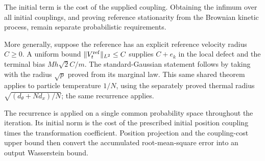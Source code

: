\documentclass[11pt,a4paper]{article}
\begin{document}
The initial term is the cost of the supplied coupling. Obtaining the infimum over all initial couplings, and proving reference stationarity from the Brownian kinetic process, remain separate probabilistic requirements.



More generally, suppose the reference has an explicit reference velocity radius \(C\ge0\). A uniform bound \(\|V_t^{\rm ref}\|_{L^2}\le C\) supplies \(C+e_k\) in the local defect and the terminal bias \(Mh\sqrt2C/m\). The standard-Gaussian statement follows by taking with the radius \(\sqrt p\) proved from its marginal law. This same shared theorem applies to particle temperature \(1/N\), using the separately proved thermal radius \(\sqrt{(d_\theta+Nd_x)/N}\); the same recurrence applies.



The recurrence is applied on a single common probability space throughout the iteration. Its initial norm is the cost of the prescribed initial position coupling times the transformation coefficient. Position projection and the coupling-cost upper bound then convert the accumulated root-mean-square error into an output Wasserstein bound.
\end{document}
